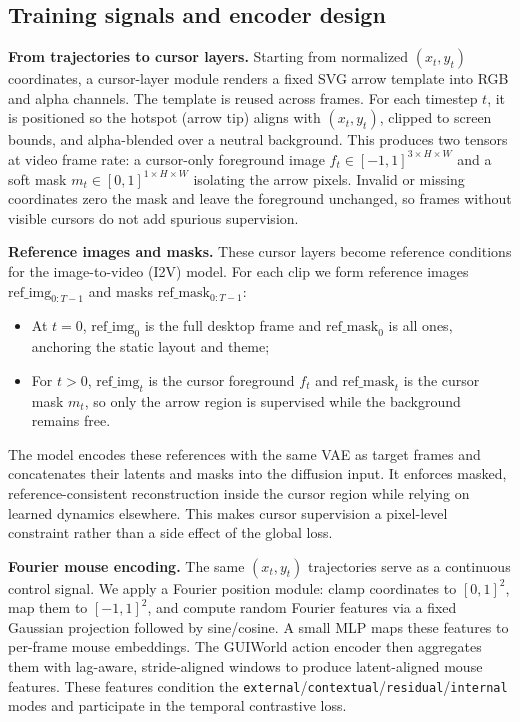\subsection{Training signals and encoder design}

\noindent\textbf{From trajectories to cursor layers.}
Starting from normalized $(x_t,y_t)$ coordinates, a cursor-layer module renders a fixed SVG arrow template into RGB and alpha channels.
The template is reused across frames.
For each timestep $t$, it is positioned so the hotspot (arrow tip) aligns with $(x_t,y_t)$, clipped to screen bounds, and alpha-blended over a neutral background.
This produces two tensors at video frame rate: a cursor-only foreground image $f_t \in [-1,1]^{3\times H \times W}$ and a soft mask $m_t \in [0,1]^{1\times H \times W}$ isolating the arrow pixels.
Invalid or missing coordinates zero the mask and leave the foreground unchanged, so frames without visible cursors do not add spurious supervision.

\noindent\textbf{Reference images and masks.}
These cursor layers become reference conditions for the image-to-video (I2V) model.
For each clip we form reference images $\mathrm{ref\_img}_{0:T-1}$ and masks $\mathrm{ref\_mask}_{0:T-1}$:
\begin{itemize}
  \item At $t{=}0$, $\mathrm{ref\_img}_0$ is the full desktop frame and $\mathrm{ref\_mask}_0$ is all ones, anchoring the static layout and theme;
  \item For $t{>}0$, $\mathrm{ref\_img}_t$ is the cursor foreground $f_t$ and $\mathrm{ref\_mask}_t$ is the cursor mask $m_t$, so only the arrow region is supervised while the background remains free.
\end{itemize}
The model encodes these references with the same VAE as target frames and concatenates their latents and masks into the diffusion input.
It enforces masked, reference-consistent reconstruction inside the cursor region while relying on learned dynamics elsewhere.
This makes cursor supervision a pixel-level constraint rather than a side effect of the global loss.

\noindent\textbf{Fourier mouse encoding.}
The same $(x_t,y_t)$ trajectories serve as a continuous control signal.
We apply a Fourier position module: clamp coordinates to $[0,1]^2$, map them to $[-1,1]^2$, and compute random Fourier features via a fixed Gaussian projection followed by sine/cosine.
A small MLP maps these features to per-frame mouse embeddings.
The GUIWorld action encoder then aggregates them with lag-aware, stride-aligned windows to produce latent-aligned mouse features.
These features condition the \texttt{external}/\texttt{contextual}/\texttt{residual}/\texttt{internal} modes and participate in the temporal contrastive loss.

